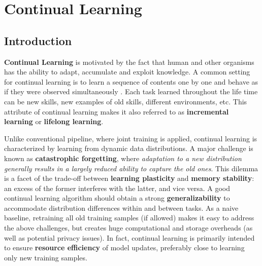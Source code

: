 \chapter{Continual Learning}
\section{Introduction}
\textbf{Continual Learning} is motivated by the fact that human and other organisms has the ability to adapt, accumulate and exploit knowledge. A common setting for continual learning is to learn a sequence of contents one by one and behave as if they were observed simultaneously \citep{wang2023comprehensive}. Each task learned throughout the life time can be new skills, new examples of old skills, different environments, etc. This attribute of continual learning makes it also referred to as \textbf{incremental learning} or \textbf{lifelong learning}.

Unlike conventional pipeline, where joint training is applied, continual learning is characterized by learning from dynamic data distributions. A major challenge is known as \textbf{catastrophic forgetting}, where \textit{adaptation to a new distribution generally results in a largely reduced ability to capture the old ones}. This dilemma is a facet of the trade-off between \textbf{learning plasticity} and \textbf{memory stability}: an excess of the former interferes with the latter, and vice versa. A good continual learning algorithm should obtain a strong \textbf{generalizability} to accommodate distribution differences within and between tasks. As a naive baseline, retraining all old training samples (if allowed) makes it easy to address the above challenges, but creates huge computational and storage overheads (as well as potential privacy issues). In fact, continual learning is primarily intended to ensure \textbf{resource efficiency} of model updates, preferably close to learning only new training samples.
